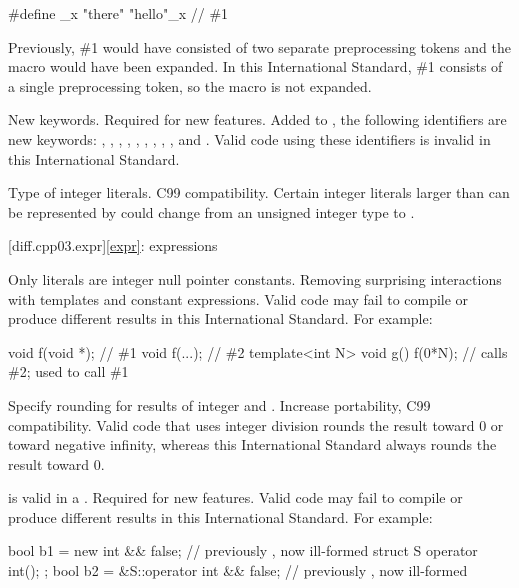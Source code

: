 \begin{codeblock}
#define _x "there"
"hello"_x         // \#1
\end{codeblock}

Previously, \#1 would have consisted of two separate preprocessing tokens and
the macro  would have been expanded. In this International Standard,
\#1 consists of a single preprocessing token, so the macro is not expanded.

\change
New keywords.
\rationale
Required for new features.
\effect
Added to , the following identifiers are new keywords:
,
,
,
,
,
,
,
,
,
and
.
Valid \CppIII{} code using these identifiers is invalid in this International
Standard.

\change
Type of integer literals.
\rationale
C99 compatibility.
\effect
Certain integer literals larger than can be represented by  could
change from an unsigned integer type to .

[diff.cpp03.expr]{\ref{expr}: expressions}

\change
Only literals are integer null pointer constants.
\rationale
Removing surprising interactions with templates and constant
expressions.
\effect
Valid \CppIII{} code may fail to compile or produce different results in
this International Standard.
For example:

\begin{codeblock}
void f(void *);  // \#1
void f(...);     // \#2
template<int N> void g() {
  f(0*N);        // calls \#2; used to call \#1
}
\end{codeblock}

\change
Specify rounding for results of integer \tcode{/} and \tcode{\%}.
\rationale
Increase portability, C99 compatibility.
\effect
Valid \CppIII{} code that uses integer division rounds the result toward 0 or
toward negative infinity, whereas this International Standard always rounds
the result toward 0.

\change
\tcode{\&\&} is valid in a .
\rationale
Required for new features.
\effect
Valid \CppIII{} code may fail to compile or produce different results in
this International Standard.
For example:

\begin{codeblock}
bool b1 = new int && false;           // previously , now ill-formed
struct S { operator int(); };
bool b2 = &S::operator int && false;  // previously , now ill-formed
\end{codeblock}

